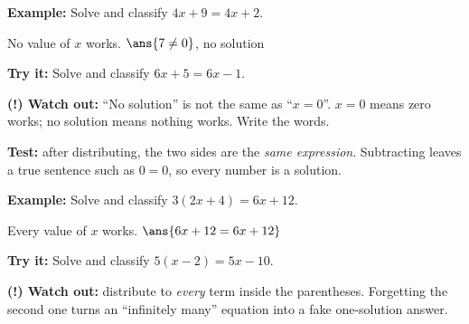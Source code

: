 \documentclass[12pt]{article}
\begin{document}
\begin{examplebox}
\textbf{Example:} \quad Solve and classify $4x + 9 = 4x + 2$.

No value of $x$ works. \quad $\ans{7 \neq 0}$, no solution
\end{examplebox}

\begin{tryitbox}
\textbf{Try it:} \quad Solve and classify $6x + 5 = 6x - 1$.\\[2pt]
\end{tryitbox}

\begin{watchoutbox}
\textbf{(!) Watch out:} ``No solution'' is not the same as ``$x = 0$''.
$x = 0$ means zero works; no solution means nothing works. Write the words.
\end{watchoutbox}


\begin{formulabox}
\textbf{Test:} after distributing, the two sides are the \emph{same
expression}. Subtracting leaves a true sentence such as $0 = 0$, so every
number is a solution.
\end{formulabox}

\begin{examplebox}
\textbf{Example:} \quad Solve and classify $3(2x + 4) = 6x + 12$.

Every value of $x$ works. \quad $\ans{6x + 12 = 6x + 12}$
\end{examplebox}

\begin{tryitbox}
\textbf{Try it:} \quad Solve and classify $5(x - 2) = 5x - 10$.\\[2pt]
\end{tryitbox}

\begin{watchoutbox}
\textbf{(!) Watch out:} distribute to \emph{every} term inside the
parentheses. Forgetting the second one turns an ``infinitely many'' equation
into a fake one-solution answer.
\end{watchoutbox}
\end{document}
